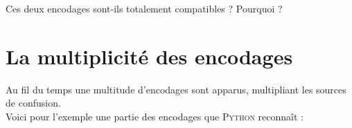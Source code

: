 \begin{exercice}[]
    Ces deux encodages sont-ils totalement compatibles ? Pourquoi ?
\end{exercice}

\section{La multiplicité des encodages}

Au fil du temps une multitude d'encodages sont apparus, multipliant les sources de confusion.\\
Voici pour l'exemple une partie des encodages que \textsc{Python} reconnaît :
\tabstyle[UGLiBlue]
\begin{center}
    {\scriptsize
        \begin{tabular}{cll}


\end{tabular}}
\end{center}
